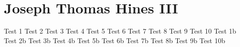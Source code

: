 \documentclass[12pt]{article}
\begin{document}
\section*{Joseph Thomas Hines III}
\label{sec:title}

\begin{multicols}{2}
	Test 1
	Test 2
	Test 3
	Test 4
	Test 5
	Test 6
	Test 7
	Test 8
	Test 9
	Test 10
\vfill\null
\columnbreak
	Test 1b
	Test 2b
	Test 3b
	Test 4b
	Test 5b
	Test 6b
	Test 7b
	Test 8b
	Test 9b
	Test 10b
\end{multicols}
\end{document}
